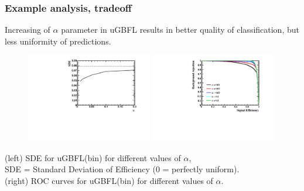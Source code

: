 \documentclass{beamer}
\begin{document}
\begin{frame}[t]
    \frametitle{Example analysis, tradeoff }
    Increasing of $\alpha$ parameter in uGBFL results in better quality of classification, but less uniformity of predictions.

    \begin{figure}[] 
        \centering 
        \includegraphics[width=0.49\textwidth]{../paperdraft/graphs2/sde_v_alpha.pdf}
        \includegraphics[width=0.49\textwidth]{../paperdraft/graphs2/ROC_DP_Alpha.pdf}
    \end{figure}
    (left) SDE for uGBFL(bin) for different values of $\alpha$, \\
    SDE = Standard Deviation of Efficiency (0 = perfectly uniform).
    \medskip    \\
    (right) ROC curves for uGBFL(bin) for different values of $\alpha$.

\end{frame}
\end{document}
